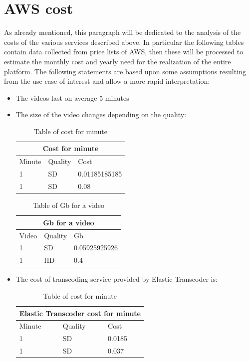 \section{AWS cost}
\label{sec:AWS cost}
As already mentioned, this paragraph will be dedicated to the analysis of the costs of the various services described above.
In particular the following tables contain data collected from price lists of AWS, then these will be processed to estimate the monthly cost and yearly need for the realization of the entire platform.
The following statements are based upon some assumptions resulting from the use case of interest and allow a more rapid interpretation:

\begin{itemize}
\item The videos last on average 5 minutes
\item The size of the video changes depending on the quality:

\begin{table}[h!]
\centering
\begin{tabular}{ |p{3cm}|p{3cm}|p{3cm}|  }
  \hline
  \multicolumn{3}{|c|}{Cost for minute} \\
  \hline
  Minute & Quality & Cost \\
  \hline
  1 & SD & 0.01185185185 \\
  1 & SD & 0.08 \\
  \hline
\end{tabular}
\caption{Table of cost for minute}
\label{table:1}
\end{table}

\begin{table}[h!]
\centering
\begin{tabular}{ |p{3cm}|p{3cm}|p{3cm}|  }
  \hline
  \multicolumn{3}{|c|}{Gb for a video} \\
  \hline
  Video & Quality & Gb \\
  \hline
  1 & SD & 0.05925925926 \\
  1 & HD & 0.4 \\
  \hline
\end{tabular}
\caption{Table of Gb for a video}
\label{table:1}
\end{table}


\item The cost of transcoding service provided by Elastic Transcoder is:

\begin{table}[h!]
\centering
\begin{tabular}{ |p{3cm}|p{3cm}|p{3cm}|  }
  \hline
  \multicolumn{3}{|c|}{Elastic Transcoder cost for minute} \\
  \hline
  Minute & Quality & Cost \\
  \hline
  1 & SD & 0.0185 \\
  1 & SD & 0.037 \\
  \hline
\end{tabular}
\caption{Table of cost for minute}
\label{table:1}
\end{table}


\end{itemize}
